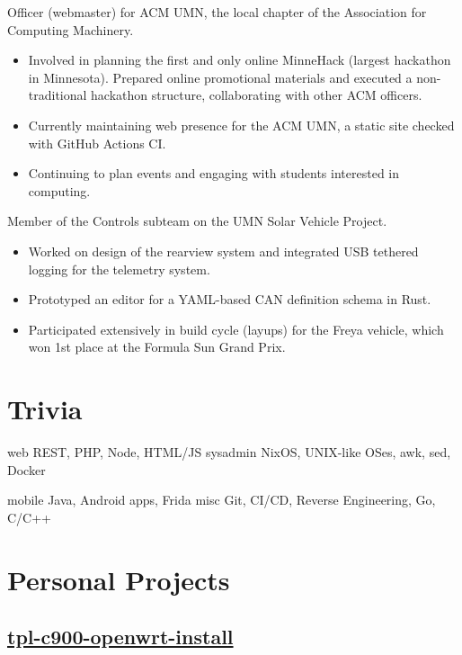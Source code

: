\documentclass{moderncv}
\newcommand{\ghsubsection}[1]{\subsection{\href{https://github.com/knownunown/#1}{#1 \faGithub}}}
\begin{document}
{
  Officer (webmaster) for ACM UMN, the local chapter of the Association for Computing Machinery.
  \begin{itemize}[label=\textbullet,noitemsep]
  \item Involved in planning the first and only online MinneHack (largest hackathon in Minnesota). Prepared online promotional materials and executed a non-traditional hackathon structure, collaborating with other ACM officers.
  \item Currently maintaining web presence for the ACM UMN, a static site checked with GitHub Actions CI.
  \item Continuing to plan events and engaging with students interested in computing.
  \end{itemize}
}

{
  Member of the Controls subteam on the UMN Solar Vehicle Project.
  \begin{itemize}[label=\textbullet,noitemsep]
  \item Worked on design of the rearview system and integrated USB tethered logging for the telemetry system.
  \item Prototyped an editor for a YAML-based CAN definition schema in Rust.
  \item Participated extensively in build cycle (layups) for the Freya vehicle, which won 1st place at the Formula Sun Grand Prix.
  \end{itemize}
}

\section{Trivia}

\cvdoubleitem
{web}
{
  REST, PHP, Node, HTML/JS
}
{sysadmin}
{
  NixOS, UNIX-like OSes, awk, sed, Docker
}

\cvdoubleitem
{mobile}
{
  Java, Android apps, Frida
}
{misc}
{
  Git, CI/CD, Reverse Engineering, Go, C/C++
}

\section{Personal Projects}

\ghsubsection{tpl-c900-openwrt-install}
\end{document}
